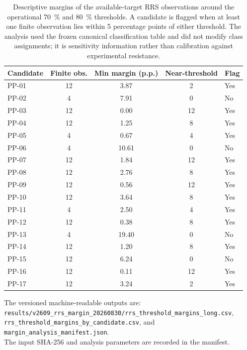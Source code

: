 \begin{table}[htbp]
\centering
\scriptsize
\caption{Descriptive margins of the available-target RRS observations around the operational \qty{70}{\percent} and \qty{80}{\percent} thresholds. A candidate is flagged when at least one finite observation lies within 5 percentage points of either threshold. The analysis used the frozen canonical classification table and did not modify class assignments; it is sensitivity information rather than calibration against experimental resistance.}
\label{tab:s18_rrs_margin_sensitivity}
\begin{tabularx}{\textwidth}{l c S[table-format=2.2] c l}
\toprule
Candidate & {Finite obs.} & {Min margin (p.p.)} & {Near-threshold} & {Flag} \\
\midrule
PP-01 & 12 & 3.87 & 2 & Yes \\
PP-02 & 4 & 7.91 & 0 & No \\
PP-03 & 12 & 0.00 & 12 & Yes \\
PP-04 & 12 & 1.25 & 8 & Yes \\
PP-05 & 4 & 0.67 & 4 & Yes \\
PP-06 & 4 & 10.61 & 0 & No \\
PP-07 & 12 & 1.84 & 12 & Yes \\
PP-08 & 12 & 2.76 & 8 & Yes \\
PP-09 & 12 & 0.56 & 12 & Yes \\
PP-10 & 12 & 3.64 & 8 & Yes \\
PP-11 & 4 & 2.50 & 4 & Yes \\
PP-12 & 12 & 0.38 & 8 & Yes \\
PP-13 & 4 & 19.40 & 0 & No \\
PP-14 & 12 & 1.20 & 8 & Yes \\
PP-15 & 12 & 6.24 & 0 & No \\
PP-16 & 12 & 0.11 & 12 & Yes \\
PP-17 & 12 & 3.24 & 2 & Yes \\
\bottomrule
\end{tabularx}
\end{table}

\noindent The versioned machine-readable outputs are:\\ 
\quad\texttt{results/v2609\_rrs\_margin\_20260830/rrs\_threshold\_margins\_long.csv},\\ 
\quad\texttt{rrs\_threshold\_margins\_by\_candidate.csv}, and\\ 
\quad\texttt{margin\_analysis\_manifest.json}.\\ 
The input SHA-256 and analysis parameters are recorded in the manifest.
